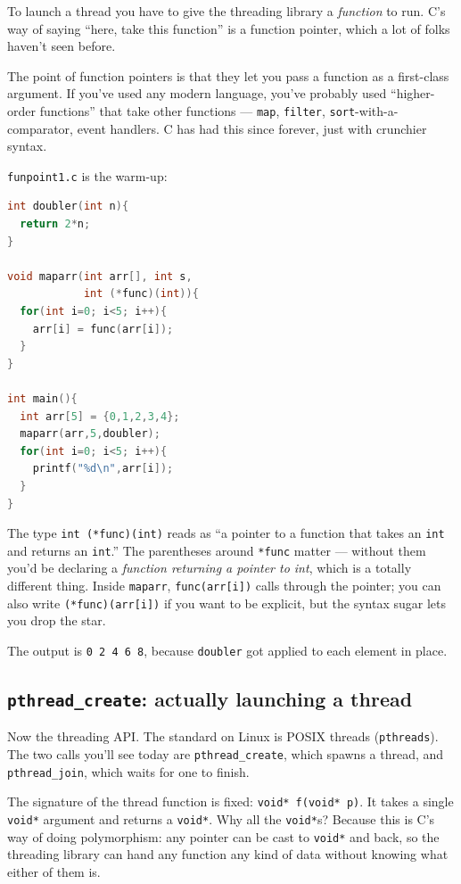 \documentclass[11pt]{article}
\begin{document}
To launch a thread you have to give the threading library a
\emph{function} to run. C's way of saying ``here, take this function''
is a function pointer, which a lot of folks haven't seen before.

The point of function pointers is that they let you pass a function as
a first-class argument. If you've used any modern language, you've
probably used ``higher-order functions'' that take other functions ---
\texttt{map}, \texttt{filter}, \texttt{sort}-with-a-comparator,
event handlers. C has had this since forever, just with crunchier
syntax.

\texttt{funpoint1.c} is the warm-up:

\begin{lstlisting}[language=C]
int doubler(int n){
  return 2*n;
}

void maparr(int arr[], int s,
            int (*func)(int)){
  for(int i=0; i<5; i++){
    arr[i] = func(arr[i]);
  }
}

int main(){
  int arr[5] = {0,1,2,3,4};
  maparr(arr,5,doubler);
  for(int i=0; i<5; i++){
    printf("%d\n",arr[i]);
  }
}
\end{lstlisting}

The type \texttt{int (*func)(int)} reads as ``a pointer to a function
that takes an \texttt{int} and returns an \texttt{int}.'' The
parentheses around \texttt{*func} matter --- without them you'd be
declaring a \emph{function returning a pointer to int}, which is a
totally different thing. Inside \texttt{maparr}, \texttt{func(arr[i])}
calls through the pointer; you can also write \texttt{(*func)(arr[i])}
if you want to be explicit, but the syntax sugar lets you drop the
star.

The output is \texttt{0 2 4 6 8}, because \texttt{doubler} got applied
to each element in place.

\subsection*{\texttt{pthread\_create}: actually launching a thread}

Now the threading API. The standard on Linux is POSIX threads
(\texttt{pthreads}). The two calls you'll see today are
\texttt{pthread\_create}, which spawns a thread, and
\texttt{pthread\_join}, which waits for one to finish.

The signature of the thread function is fixed:
\texttt{void* f(void* p)}. It takes a single \texttt{void*} argument
and returns a \texttt{void*}. Why all the \texttt{void*}s? Because
this is C's way of doing polymorphism: any pointer can be cast to
\texttt{void*} and back, so the threading library can hand any
function any kind of data without knowing what either of them is.
\end{document}
